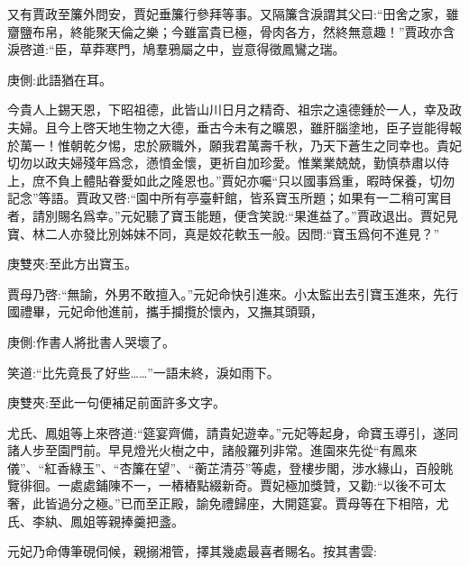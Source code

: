 \begin{parag}
    又有賈政至簾外問安，賈妃垂簾行參拜等事。又隔簾含淚謂其父曰:“田舍之家，雖齏鹽布帛，終能聚天倫之樂；今雖富貴已極，骨肉各方，然終無意趣！”賈政亦含淚啓道:“臣，草莽寒門，鳩羣鴉屬之中，豈意得徵鳳鸞之瑞。\begin{note}庚側:此語猶在耳。\end{note}今貴人上錫天恩，下昭祖德，此皆山川日月之精奇、祖宗之遠德鍾於一人，幸及政夫婦。且今上啓天地生物之大德，垂古今未有之曠恩，雖肝腦塗地，臣子豈能得報於萬一！惟朝乾夕惕，忠於厥職外，願我君萬壽千秋，乃天下蒼生之同幸也。貴妃切勿以政夫婦殘年爲念，懣憤金懷，更祈自加珍愛。惟業業兢兢，勤慎恭肅以侍上，庶不負上體貼眷愛如此之隆恩也。”賈妃亦囑“只以國事爲重，暇時保養，切勿記念”等語。賈政又啓:“園中所有亭臺軒館，皆系寶玉所題；如果有一二稍可寓目者，請別賜名爲幸。”元妃聽了寶玉能題，便含笑說:“果進益了。”賈政退出。賈妃見寶、林二人亦發比別姊妹不同，真是姣花軟玉一般。因問:“寶玉爲何不進見？”\begin{note}庚雙夾:至此方出寶玉。\end{note}賈母乃啓:“無諭，外男不敢擅入。”元妃命快引進來。小太監出去引寶玉進來，先行國禮畢，元妃命他進前，攜手攔攬於懷內，又撫其頭頸，\begin{note}庚側:作書人將批書人哭壞了。\end{note}笑道:“比先竟長了好些……”一語未終，淚如雨下。\begin{note}庚雙夾:至此一句便補足前面許多文字。\end{note}
\end{parag}


\begin{parag}
    尤氏、鳳姐等上來啓道:“筵宴齊備，請貴妃遊幸。”元妃等起身，命寶玉導引，遂同諸人步至園門前。早見燈光火樹之中，諸般羅列非常。進園來先從“有鳳來儀”、“紅香綠玉”、“杏簾在望”、“蘅芷清芬”等處，登樓步閣，涉水緣山，百般眺覽徘徊。一處處鋪陳不一，一樁樁點綴新奇。賈妃極加獎贊，又勸:“以後不可太奢，此皆過分之極。”已而至正殿，諭免禮歸座，大開筵宴。賈母等在下相陪，尤氏、李紈、鳳姐等親捧羹把盞。
\end{parag}


\begin{parag}
    元妃乃命傳筆硯伺候，親搦湘管，擇其幾處最喜者賜名。按其書雲:
\end{parag}


